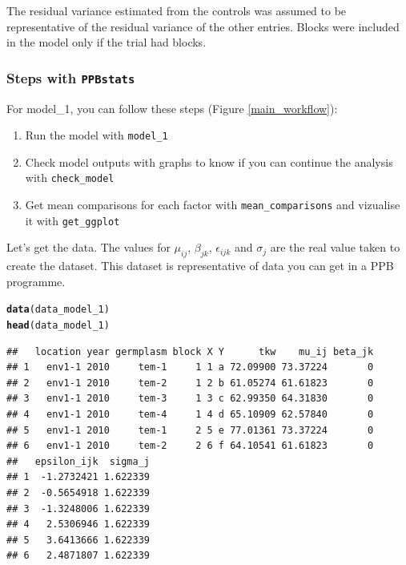 \documentclass{book}\usepackage[]{graphicx}\usepackage[]{color}
\makeatletter
\newcommand{\hlstd}[1]{\textcolor[rgb]{0.345,0.345,0.345}{#1}}%
\newcommand{\hlkwd}[1]{\textcolor[rgb]{0.737,0.353,0.396}{\textbf{#1}}}%
\newenvironment{kframe}{%
 \def\at@end@of@kframe{}%
 \ifinner\ifhmode%
  \def\at@end@of@kframe{\end{minipage}}%
  \begin{minipage}{\columnwidth}%
 \fi\fi%
 \def\FrameCommand##1{\hskip\@totalleftmargin \hskip-\fboxsep
 \colorbox{shadecolor}{##1}\hskip-\fboxsep
     \hskip-\linewidth \hskip-\@totalleftmargin \hskip\columnwidth}%
 \MakeFramed {\advance\hsize-\width
   \@totalleftmargin\z@ \linewidth\hsize
   \@setminipage}}%
 {\par\unskip\endMakeFramed%
 \at@end@of@kframe}
\newenvironment{knitrout}{}{} %
\newcommand{\pack}{\texttt{PPBstats}}
\makeatother
\begin{document}
The residual variance estimated from the controls was assumed to be representative of the residual variance of the other entries.
Blocks were included in the model only if the trial had blocks.

\subsubsection{Steps with \pack}

For model\_1, you can follow these steps (Figure \ref{main_workflow}):

\begin{enumerate}
\item Run the model with \texttt{model\_1}
\item Check model outputs with graphs to know if you can continue the analysis with \texttt{check\_model}
\item Get mean comparisons for each factor with \texttt{mean\_comparisons} and vizualise it with \texttt{get\_ggplot}
\end{enumerate}

Let's get the data.
The values for $\mu_{ij}$, $\beta_{jk}$, $\epsilon_{ijk}$ and $\sigma_j$ are the real value taken to create the dataset.
This dataset is representative of data you can get in a PPB programme.

\begin{knitrout}
\color{fgcolor}\begin{kframe}
\begin{alltt}
\hlkwd{data}\hlstd{(data_model_1)}
\hlkwd{head}\hlstd{(data_model_1)}
\end{alltt}
\begin{verbatim}
##   location year germplasm block X Y      tkw    mu_ij beta_jk
## 1   env1-1 2010     tem-1     1 1 a 72.09900 73.37224       0
## 2   env1-1 2010     tem-2     1 2 b 61.05274 61.61823       0
## 3   env1-1 2010     tem-3     1 3 c 62.99350 64.31830       0
## 4   env1-1 2010     tem-4     1 4 d 65.10909 62.57840       0
## 5   env1-1 2010     tem-1     2 5 e 77.01361 73.37224       0
## 6   env1-1 2010     tem-2     2 6 f 64.10541 61.61823       0
##   epsilon_ijk  sigma_j
## 1  -1.2732421 1.622339
## 2  -0.5654918 1.622339
## 3  -1.3248006 1.622339
## 4   2.5306946 1.622339
## 5   3.6413666 1.622339
## 6   2.4871807 1.622339
\end{verbatim}
\end{kframe}
\end{knitrout}
\end{document}
